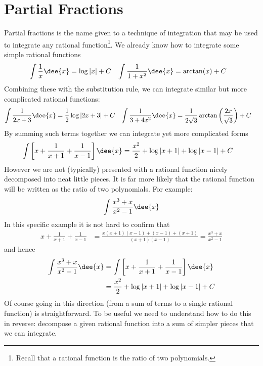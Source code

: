 \begin{eg}
\end{eg}

\section{Partial Fractions}\label{sec parfrac}
Partial fractions is the name given to a technique of integration
that may be used to integrate any rational function\footnote{Recall that a rational
function is the ratio of two polynomials.}. We already know how to integrate some simple
rational
functions
\begin{align*}
  \int \frac{1}{x}\dee{x} &= \log|x|+C &
  \int \frac{1}{1+x^2} \dee{x} &= \arctan(x) +C
\end{align*}
Combining these with the substitution rule, we can integrate similar but more complicated
rational functions:
\begin{align*}
  \int \frac{1}{2x+3}\dee{x} &= \frac{1}{2} \log|2x+3| +C &
  \int \frac{1}{3+4x^2}\dee{x} &= \frac{1}{2\sqrt{3}} \arctan\left( \frac{2x}{\sqrt{3}}
\right) +C
\end{align*}
By summing such terms together we can integrate yet more complicated forms
\begin{align*}
  \int \left[ x + \frac{1}{x+1} + \frac{1}{x-1} \right]\dee{x}
  &= \frac{x^2}{2} + \log|x+1| + \log|x-1| +C
\end{align*}
However we are not (typically) presented with a rational function nicely decomposed into
neat little pieces. It is far more likely that the rational function will be written as
the ratio of two polynomials. For example:
\begin{align*}
  \int \frac{x^3+x}{x^2-1}\dee{x}
\end{align*}
In this specific example it is not hard to confirm that
\begin{align*}
x+\frac{1}{x+1} +\frac{1}{x-1}
&=\frac{x(x+1)(x-1) +(x-1) +(x+1)}{(x+1)(x-1)}
=\frac{x^3+x}{x^2-1}
\end{align*}
and hence
\begin{align*}
  \int \frac{x^3+x}{x^2-1}\dee{x}
&= \int \left[ x + \frac{1}{x+1} + \frac{1}{x-1} \right]\dee{x} \\
&= \frac{x^2}{2} + \log|x+1| + \log|x-1| +C
\end{align*}
Of course going in this direction (from a sum of terms to a single rational function) is
straightforward. To be useful we need to understand how to do this in reverse:
decompose a given rational function into a sum of simpler pieces that we can integrate.

